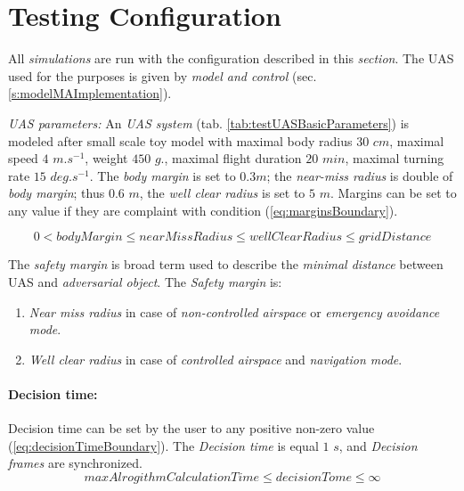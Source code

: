 \cleardoublepage
\section{Testing Configuration}\label{sec:testingConfiguration}

    \noindent All \emph{simulations} are run with the configuration described in this \emph{section}. The UAS used for the purposes is given by \emph{model and control} (sec. \ref{s:modelMAImplementation}). 
    
    \emph{UAS parameters:} An \emph{UAS system} (tab. \ref{tab:testUASBasicParameters}) is modeled after small scale toy model with maximal body radius $30$ $cm$, maximal speed $4$ $m.s^{-1}$, weight $450$ $g$., maximal flight duration $20$ $min$, maximal turning rate $15$ $deg.s^{-1}$. The \emph{body margin} is set to $0.3 m$; the \emph{near-miss radius} is double of \emph{body margin}; thus $0.6$ $m$, the \emph{well clear radius} is set to $5$ $m$. Margins can be set to any value if they are complaint with condition (\ref{eq:marginsBoundary}).
    
    \begin{equation}\label{eq:marginsBoundary}
        0 < bodyMargin \le nearMissRadius \le wellClearRadius \le gridDistance
    \end{equation}   
    
    \begin{note}
        The \emph{safety margin} is broad term used to describe the \emph{minimal distance} between UAS and \emph{adversarial object}. The \emph{Safety margin} is:
        
        \begin{enumerate}
            \item \emph{Near miss radius} in case of \emph{non-controlled airspace} or \emph{emergency avoidance mode}.
            
            \item \emph{Well clear radius} in case of \emph{controlled airspace} and \emph{navigation mode}.
        \end{enumerate}
    \end{note}
    
	\paragraph{Decision time:} Decision time can be set by the user to any positive non-zero value (\ref{eq:decisionTimeBoundary}). The \emph{Decision time} is equal $1$ $s$, and \emph{Decision frames} are synchronized.
    \begin{equation}\label{eq:decisionTimeBoundary}
        maxAlrogithmCalculationTime \le decisionTome \le \infty
    \end{equation}
    
